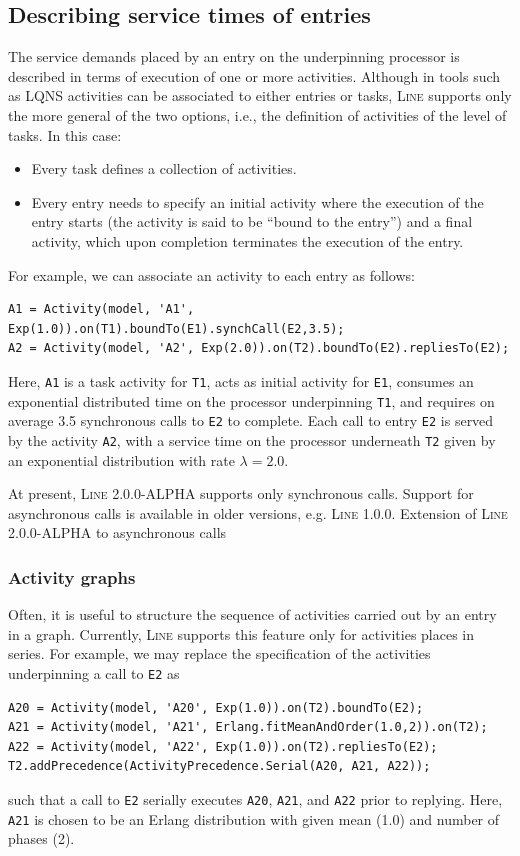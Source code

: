 \subsection{Describing service times of entries}
The service demands placed by an entry on the underpinning processor is described in terms of execution of one or more activities. Although in tools such as LQNS activities can be associated to either entries or tasks, \textsc{Line} supports only the more general of the two options, i.e., the definition of activities of the level of tasks. In this case:
\begin{itemize}
\item Every task defines a collection of activities.
\item Every entry needs to specify an initial activity where the execution of the entry starts (the activity is said to be ``bound to the entry'') and a final activity, which upon completion terminates the execution of the entry.
\end{itemize}
For example, we can associate an activity to each entry as follows:
\begin{lstlisting}
A1 = Activity(model, 'A1', Exp(1.0)).on(T1).boundTo(E1).synchCall(E2,3.5);
A2 = Activity(model, 'A2', Exp(2.0)).on(T2).boundTo(E2).repliesTo(E2);
\end{lstlisting}
Here, \texttt{A1} is a task activity for \texttt{T1}, acts as initial activity for \texttt{E1}, consumes an exponential distributed time on the processor underpinning \texttt{T1}, and requires on average 3.5 synchronous calls to \texttt{E2} to complete. Each call to entry \texttt{E2} is served by the activity  \texttt{A2}, with a service time on the processor underneath \texttt{T2} given by an exponential distribution with rate $\lambda=2.0$.

At present, \textsc{Line} 2.0.0-ALPHA supports only synchronous calls. Support for asynchronous calls is available in older versions, e.g. \textsc{Line} 1.0.0. Extension of \textsc{Line} 2.0.0-ALPHA to asynchronous calls

\subsubsection{Activity graphs}
Often, it is useful to structure the sequence of activities carried out by an entry in a graph. Currently, \textsc{Line} supports this feature only for activities places in series. For example, we may replace the specification of the activities underpinning a call to \texttt{E2} as
\begin{lstlisting}
A20 = Activity(model, 'A20', Exp(1.0)).on(T2).boundTo(E2);
A21 = Activity(model, 'A21', Erlang.fitMeanAndOrder(1.0,2)).on(T2);
A22 = Activity(model, 'A22', Exp(1.0)).on(T2).repliesTo(E2);
T2.addPrecedence(ActivityPrecedence.Serial(A20, A21, A22));
\end{lstlisting}
such that a call to \texttt{E2} serially executes \texttt{A20}, \texttt{A21}, and \texttt{A22} prior to replying. Here, \texttt{A21} is chosen to be an Erlang distribution with given mean (1.0) and number of phases (2).

